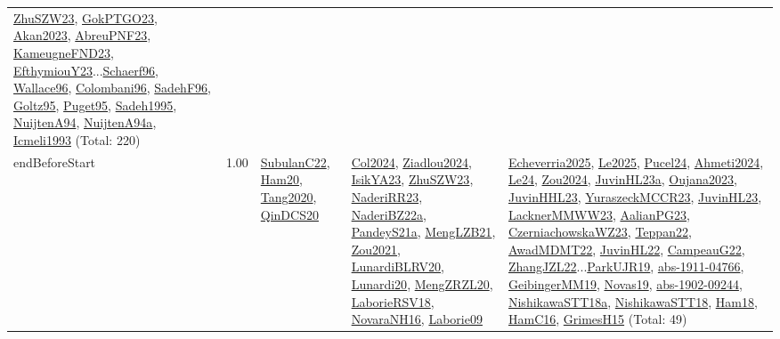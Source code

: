 {\begin{longtable}{p{3cm}r>{\raggedright\arraybackslash}p{6cm}>{\raggedright\arraybackslash}p{6cm}>{\raggedright\arraybackslash}p{8cm}}
\hyperref[detail:ZhuSZW23]{ZhuSZW23}, \hyperref[detail:GokPTGO23]{GokPTGO23}, \hyperref[detail:Akan2023]{Akan2023}, \hyperref[detail:AbreuPNF23]{AbreuPNF23}, \hyperref[detail:KameugneFND23]{KameugneFND23}, \hyperref[detail:EfthymiouY23]{EfthymiouY23}...\hyperref[detail:Schaerf96]{Schaerf96}, \hyperref[detail:Wallace96]{Wallace96}, \hyperref[detail:Colombani96]{Colombani96}, \hyperref[detail:SadehF96]{SadehF96}, \hyperref[detail:Goltz95]{Goltz95}, \hyperref[detail:Puget95]{Puget95}, \hyperref[detail:Sadeh1995]{Sadeh1995}, \hyperref[detail:NuijtenA94]{NuijtenA94}, \hyperref[detail:NuijtenA94a]{NuijtenA94a}, \hyperref[detail:Icmeli1993]{Icmeli1993} (Total: 220)\\
\index{endBeforeStart}\index{Constraints!endBeforeStart}endBeforeStart &  1.00 & \hyperref[detail:SubulanC22]{SubulanC22}, \hyperref[detail:Ham20]{Ham20}, \hyperref[detail:Tang2020]{Tang2020}, \hyperref[detail:QinDCS20]{QinDCS20} & \hyperref[detail:Col2024]{Col2024}, \hyperref[detail:Ziadlou2024]{Ziadlou2024}, \hyperref[detail:IsikYA23]{IsikYA23}, \hyperref[detail:ZhuSZW23]{ZhuSZW23}, \hyperref[detail:NaderiRR23]{NaderiRR23}, \hyperref[detail:NaderiBZ22a]{NaderiBZ22a}, \hyperref[detail:PandeyS21a]{PandeyS21a}, \hyperref[detail:MengLZB21]{MengLZB21}, \hyperref[detail:Zou2021]{Zou2021}, \hyperref[detail:LunardiBLRV20]{LunardiBLRV20}, \hyperref[detail:Lunardi20]{Lunardi20}, \hyperref[detail:MengZRZL20]{MengZRZL20}, \hyperref[detail:LaborieRSV18]{LaborieRSV18}, \hyperref[detail:NovaraNH16]{NovaraNH16}, \hyperref[detail:Laborie09]{Laborie09} & \hyperref[detail:Echeverria2025]{Echeverria2025}, \hyperref[detail:Le2025]{Le2025}, \hyperref[detail:Pucel24]{Pucel24}, \hyperref[detail:Ahmeti2024]{Ahmeti2024}, \hyperref[detail:Le24]{Le24}, \hyperref[detail:Zou2024]{Zou2024}, \hyperref[detail:JuvinHL23a]{JuvinHL23a}, \hyperref[detail:Oujana2023]{Oujana2023}, \hyperref[detail:JuvinHHL23]{JuvinHHL23}, \hyperref[detail:YuraszeckMCCR23]{YuraszeckMCCR23}, \hyperref[detail:JuvinHL23]{JuvinHL23}, \hyperref[detail:LacknerMMWW23]{LacknerMMWW23}, \hyperref[detail:AalianPG23]{AalianPG23}, \hyperref[detail:CzerniachowskaWZ23]{CzerniachowskaWZ23}, \hyperref[detail:Teppan22]{Teppan22}, \hyperref[detail:AwadMDMT22]{AwadMDMT22}, \hyperref[detail:JuvinHL22]{JuvinHL22}, \hyperref[detail:CampeauG22]{CampeauG22}, \hyperref[detail:ZhangJZL22]{ZhangJZL22}...\hyperref[detail:ParkUJR19]{ParkUJR19}, \hyperref[detail:abs-1911-04766]{abs-1911-04766}, \hyperref[detail:GeibingerMM19]{GeibingerMM19}, \hyperref[detail:Novas19]{Novas19}, \hyperref[detail:abs-1902-09244]{abs-1902-09244}, \hyperref[detail:NishikawaSTT18a]{NishikawaSTT18a}, \hyperref[detail:NishikawaSTT18]{NishikawaSTT18}, \hyperref[detail:Ham18]{Ham18}, \hyperref[detail:HamC16]{HamC16}, \hyperref[detail:GrimesH15]{GrimesH15} (Total: 49)\\

\end{longtable}}
